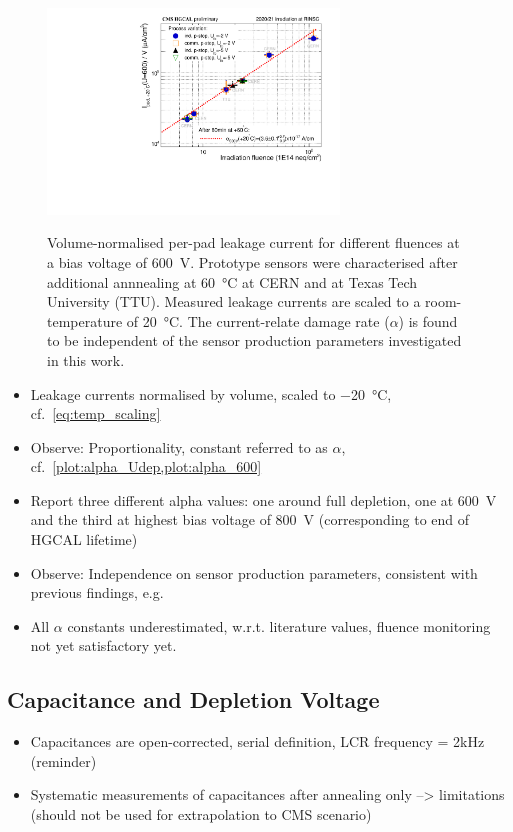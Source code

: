 \begin{figure}
	\captionsetup[subfigure]{aboveskip=-1pt,belowskip=-1pt}
	\centering
    \includegraphics[width=0.69\textwidth]{plots/alpha/alpha_600V.pdf}
    \label{plot:alpha_600}
	\caption{
	    Volume-normalised per-pad leakage current for different fluences at a bias voltage of \SI{600}{\volt}.
        Prototype sensors were characterised after additional annnealing at \SI{60}{\celsius} at CERN and at Texas Tech University (TTU).
		Measured leakage currents are scaled to a room-temperature of \SI{+20}{\celsius}.
        The current-relate damage rate ($\alpha$) is found to be independent of the sensor production parameters investigated in this work.
	}
\end{figure}

\begin{itemize}
	\item Leakage currents normalised by volume, scaled to \SI{-20}{\celsius}, cf.~\ref{eq:temp_scaling}
	\item Observe: Proportionality, constant referred to as $\alpha$, cf.~\ref{plot:alpha_Udep,plot:alpha_600}
	\item Report three different alpha values: one around full depletion, one at \SI{600}{\volt} and the third at highest bias voltage of \SI{800}{\volt} (corresponding to end of HGCAL lifetime)
	\item Observe: Independence on sensor production parameters, consistent with previous findings, e.g.~\cite{moll:SiDamages}
	\item All $\alpha$ constants underestimated, w.r.t. literature values, fluence monitoring not yet satisfactory yet.
\end{itemize}


\subsection{Capacitance and Depletion Voltage}
\label{subsec:Udep}
\begin{itemize}
	\item Capacitances are open-corrected, serial definition, LCR frequency = 2kHz (reminder)
	\item Systematic measurements of capacitances after annealing only --> limitations (should not be used for extrapolation to CMS scenario)
\end{itemize}


